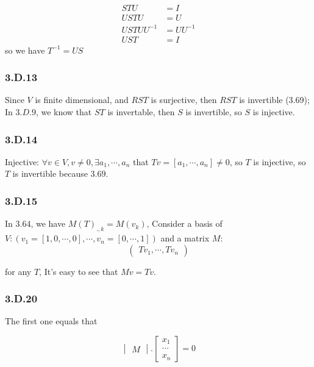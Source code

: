 \begin{equation*}
    \begin{split}
    STU &= I \\
    USTU &= U \\
    USTUU^{-1} &= UU^{-1} \\
    UST &= I
\end{split}
\end{equation*}
so we have $T^{-1} = US$

\subsubsection*{3.D.13}

Since $V$ is finite dimensional, and $RST$ is surjective, then $RST$ is invertible (3.69); In $3.D.9$, we know that $ST$ is invertable, then $S$ is invertible, so $S$ is injective.

\subsubsection*{3.D.14}

Injective: $\forall v \in V, v \neq 0, \exists a_{1}, \cdots, a_{n}$ that $Tv = [a_{1}, \cdots, a_{n}] \neq {0}$, so $T$ is injective, so $T$ is invertible because $3.69$.

\subsubsection*{3.D.15}

In $3.64$, we have $M(T)_{.,k} = M(v_{k})$, Consider a basis of $V: (v_{1} = [1, 0, \cdots, 0], \cdots, v_{n} = [0, \cdots, 1])$ and a matrix $M$:
\[
\begin{pmatrix}
Tv_{1}, \cdots, Tv_{n}
\end{pmatrix}
\]

for any $T$, It's easy to see that $Mv = Tv$.

\subsubsection*{3.D.20}

The first one equals that

\begin{equation}
    \begin{vmatrix}
    M
    \end{vmatrix} . 
    \begin{bmatrix}
    x_{1} \\ \cdots \\ x_{n}
    \end{bmatrix}  = 0
\end{equation}

